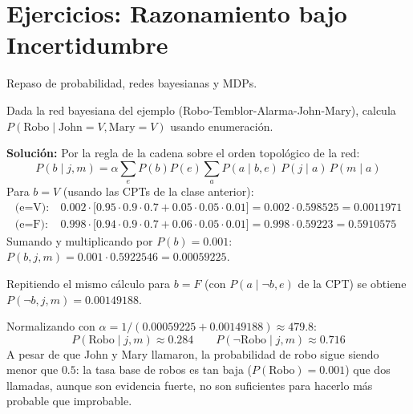 \section{Ejercicios: Razonamiento bajo Incertidumbre}

\begin{remark}
Repaso de probabilidad, redes bayesianas y MDPs.
\end{remark}

\begin{exercise}
Dada la red bayesiana del ejemplo (Robo-Temblor-Alarma-John-Mary), calcula $P(\text{Robo} \mid \text{John} = V, \text{Mary} = V)$ usando enumeración.

\textbf{Solución:} Por la regla de la cadena sobre el orden topológico de la red:
\[
    P(b \mid j, m) = \alpha \sum_{e} P(b) P(e) \sum_{a} P(a \mid b, e)\, P(j \mid a)\, P(m \mid a)
\]
Para $b=V$ (usando las CPTs de la clase anterior):
\begin{align*}
    \text{(e=V):}\ & 0.002 \cdot \big[0.95\cdot0.9\cdot0.7 + 0.05\cdot0.05\cdot0.01\big] = 0.002 \cdot 0.598525 = 0.0011971 \\
    \text{(e=F):}\ & 0.998 \cdot \big[0.94\cdot0.9\cdot0.7 + 0.06\cdot0.05\cdot0.01\big] = 0.998 \cdot 0.59223 = 0.5910575
\end{align*}
Sumando y multiplicando por $P(b)=0.001$: $P(b,j,m) = 0.001 \cdot 0.5922546 = 0.00059225$.

Repitiendo el mismo cálculo para $b=F$ (con $P(a\mid\neg b,e)$ de la CPT) se obtiene $P(\neg b,j,m) = 0.00149188$.

Normalizando con $\alpha = 1/(0.00059225+0.00149188) \approx 479.8$:
\[
    P(\text{Robo}\mid j,m) \approx 0.284 \qquad P(\neg\text{Robo}\mid j,m) \approx 0.716
\]
A pesar de que John y Mary llamaron, la probabilidad de robo sigue siendo menor que $0.5$: la tasa base de robos es
tan baja ($P(\text{Robo})=0.001$) que dos llamadas, aunque son evidencia fuerte, no son suficientes para hacerlo más
probable que improbable.
\end{exercise}
